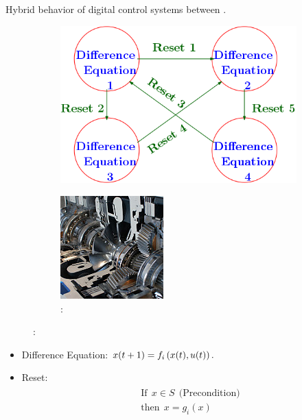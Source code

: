 \begin{frame}{Hybrid behavior of digital control systems}
 between .\\
\begin{figure}
\center
\begin{subfigure}{0.7\linewidth}
\includegraphics[scale=0.4]{fig/hybrid-model.png}
\end{subfigure}
\begin{subfigure}{0.25\linewidth}
\includegraphics[scale=0.6]{fig/automatic-transmission.jpg}
\caption*{: }
\end{subfigure}
\end{figure}
\begin{itemize}
\item Difference Equation: $x(t+1)=f_i\left(x(t),u(t)\right).$
\item Reset: \vspace{-1.5em}
\begin{align}
\begin{split}
& \text{If}~~x\in S~~\text{(Precondition)}\\
& \text{then}~~x = g_i(x)
\end{split}
\end{align}
\end{itemize}
\end{frame}

